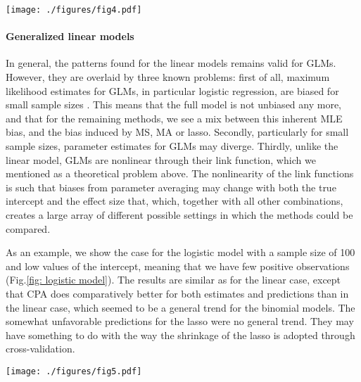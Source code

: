 \documentclass[5p]{elsarticle}
\begin{document}
\begin{figure*}\label{fig: linear interactions}
\texttt{[image: ./figures/fig4.pdf]}
\caption{Bias and predictive error of parameter estimates for linear regressions with half of the parameters being interactions, calculated for independent (left) and collinear predictors.}
\end{figure*}


\paragraph{Generalized linear models} 

In general, the patterns found for the linear models remains valid for GLMs. However, they are overlaid by three known problems: first of all, maximum likelihood estimates for GLMs, in particular logistic regression, are biased for small sample sizes \citep{Cordeiro-BiasCorrectionin-1991, Wisz-Effectssamplesize-2008}. This means that the full model is not unbiased any more, and that for the remaining methods, we see a mix between this inherent MLE bias, and the bias induced by MS, MA or lasso. Secondly, particularly for small sample sizes, parameter estimates for GLMs may diverge. Thirdly, unlike the linear model, GLMs are nonlinear through their link function, which we mentioned as a theoretical problem above. The nonlinearity of the link functions is such that biases from parameter averaging may change with both the true intercept and the effect size that, which, together with all other combinations, creates a large array of different possible settings in which the methods could be compared. 

As an example, we show the case for the logistic model with a sample size of 100 and low values of the intercept, meaning that we have few positive observations (Fig.\ref{fig: logistic model}). The results are similar as for the linear case, except that CPA does comparatively better for both estimates and predictions than in the linear case, which seemed to be a general trend for the binomial models. The somewhat unfavorable predictions for the lasso were no general trend. They may have something to do with the way the shrinkage of the lasso is adopted through cross-validation. 

\begin{figure*}\label{fig: logistic model}
\texttt{[image: ./figures/fig5.pdf]}
\caption{Bias and predictive error of parameter estimates for logistic regressions with independent (left) and collinear predictors.}
\end{figure*}
\end{document}
